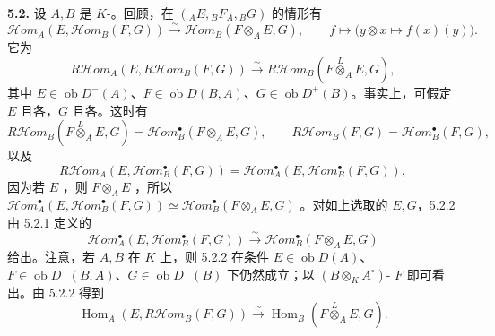\textbf{5.2.} 设 $A,B$ 是 $K$-。回顾，在 $({}_AE,{}_BF_A,{}_BG)$ 的情形有
\begin{equation}\mathcal{H}\!om_A(E,\mathcal{H}\!om_B(F,G))\xrightarrow\sim\mathcal{H}\!om_B(F\otimes_A E,G),\qquad f\longmapsto\bigl(y\otimes x\longmapsto f(x)(y)\bigr).\tag{5.2.1}\end{equation}
它为
\begin{equation}R\mathcal{H}\!om_A(E,R\mathcal{H}\!om_B(F,G))\xrightarrow\sim R\mathcal{H}\!om_B(F\overset L\otimes_A E,G),\tag{5.2.2}\end{equation}
其中 $E\in\operatorname{ob}D^-(A)$、$F\in\operatorname{ob}D(B,A)$、$G\in\operatorname{ob}D^+(B)$。事实上，可假定 $E$ 且各，$G$ 且各。这时有
\[R\mathcal{H}\!om_B(F\overset L\otimes_A E,G)=\mathcal{H}\!om_B^\bullet(F\otimes_A E,G),\qquad R\mathcal{H}\!om_B(F,G)=\mathcal{H}\!om_B^\bullet(F,G),\]
以及
\[R\mathcal{H}\!om_A(E,\mathcal{H}\!om_B^\bullet(F,G))=\mathcal{H}\!om_A^\bullet(E,\mathcal{H}\!om_B^\bullet(F,G)),\]
因为若 $E$ ，则 $F\otimes_A E$ ，所以 $\mathcal{H}\!om_A^\bullet(E,\mathcal{H}\!om_B^\bullet(F,G))\simeq\mathcal{H}\!om_B^\bullet(F\otimes_A E,G)$ 。对如上选取的 $E,G$，5.2.2 由 5.2.1 定义的
\[\mathcal{H}\!om_A^\bullet(E,\mathcal{H}\!om_B^\bullet(F,G))\xrightarrow\sim\mathcal{H}\!om_B^\bullet(F\otimes_A E,G)\]
给出。注意，若 $A,B$ 在 $K$ 上，则 5.2.2 在条件 $E\in\operatorname{ob}D(A)$、$F\in\operatorname{ob}D^-(B,A)$、$G\in\operatorname{ob}D^+(B)$ 下仍然成立；以 $(B\otimes_K A^\circ)$- $F$ 即可看出。由 5.2.2 得到
\begin{equation}\operatorname{Hom}_A(E,R\mathcal{H}\!om_B(F,G))\xrightarrow\sim\operatorname{Hom}_B(F\overset L\otimes_A E,G).\tag{5.2.3}\end{equation}

